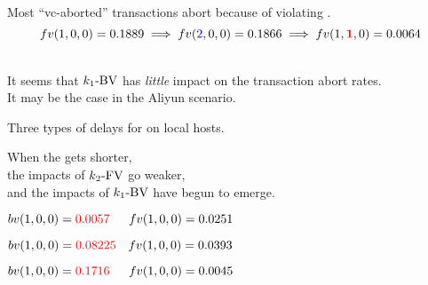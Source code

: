 \begin{frame}{}

  \pause
  Most ``vc-aborted'' transactions abort because of violating \red{$\ktwofv$}.
  \[
    fv(1,0,0) = 0.1889 \implies fv(\textcolor{blue}{2},0,0) = 0.1866 \implies fv(1,\textcolor{red}{\bf 1},0) = 0.0064
  \]
\end{frame}

\begin{frame}{}
  \begin{center}
     \\[10pt]
    It seems that $k_1\text{-BV}$ has \emph{little} impact on the transaction abort rates. \\[30pt]
    \pause
    It may be the case in the Aliyun scenario. \\[10pt]
  \end{center}
\end{frame}

\begin{frame}{}
  \centerline{Three types of delays for  on local hosts.}
  
\end{frame}

\begin{frame}{}

  \begin{center}
    When the  gets shorter, \\
    the impacts of $\ktwofv$ go weaker, \\
    and the impacts of $k_1\text{-BV}$ have begun to emerge.
  \end{center}
\end{frame}

\begin{frame}{}
  \begin{description}[issueDelay = 20ms:]
    \setlength{\itemsep}{10pt}
    \item[issueDelay = 20ms:] $bv(1,0,0) = \textcolor{red}{0.0057} \quad\;\; fv(1,0,0) = 0.0251$
    \item[issueDelay = 15ms:] $bv(1,0,0) = \textcolor{red}{0.08225} \quad fv(1,0,0) = 0.0393$
    \item[issueDelay = 5ms:] $bv(1,0,0) = \textcolor{red}{0.1716} \quad\;\; fv(1,0,0) = 0.0045$
  \end{description}
\end{frame}

